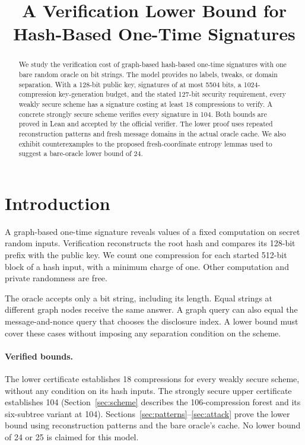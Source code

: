 \documentclass[10pt]{article}
\title{A Verification Lower Bound for Hash-Based One-Time Signatures}
\author{}
\date{}
\begin{document}
\maketitle

\begin{abstract}
We study the verification cost of graph-based hash-based one-time signatures with one bare random oracle on bit strings. The model provides no labels, tweaks, or domain separation. With a 128-bit public key, signatures of at most 5504 bits, a 1024-compression key-generation budget, and the stated 127-bit security requirement, every weakly secure scheme has a signature costing at least 18 compressions to verify. A concrete strongly secure scheme verifies every signature in 104. Both bounds are proved in Lean and accepted by the official verifier. The lower proof uses repeated reconstruction patterns and fresh message domains in the actual oracle cache. We also exhibit counterexamples to the proposed fresh-coordinate entropy lemmas used to suggest a bare-oracle lower bound of 24.
\end{abstract}

\setcounter{tocdepth}{2}
\tableofcontents

\section{Introduction}\label{sec:intro}

A graph-based one-time signature reveals values of a fixed computation on secret random inputs. Verification reconstructs the root hash and compares its 128-bit prefix with the public key. We count one compression for each started 512-bit block of a hash input, with a minimum charge of one. Other computation and private randomness are free.

The oracle accepts only a bit string, including its length. Equal strings at different graph nodes receive the same answer. A graph query can also equal the message-and-nonce query that chooses the disclosure index. A lower bound must cover these cases without imposing any separation condition on the scheme.

\paragraph{Verified bounds.}
The lower certificate establishes 18 compressions for every weakly secure scheme, without any condition on its hash inputs. The strongly secure upper certificate establishes 104 (Section~\ref{sec:scheme} describes the 106-compression forest and its six-subtree variant at 104). Sections~\ref{sec:patterns}--\ref{sec:attack} prove the lower bound using reconstruction patterns and the bare oracle's cache. No lower bound of 24 or 25 is claimed for this model.
\end{document}

